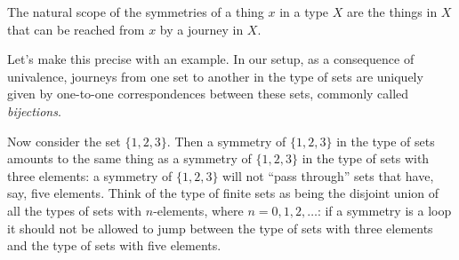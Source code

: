 The natural scope of the symmetries of a thing $x$ in a type $X$
are the things in $X$ that can be reached from $x$ by a journey in $X$.

Let's make this precise with an example.
In our setup,
as a consequence of univalence, journeys from one set to another
in the type of sets are
uniquely given by one-to-one correspondences between these sets,
commonly called \emph{bijections}.

Now consider the set $\{1,2,3\}$. Then a symmetry of $\{1,2,3\}$ in the type of  sets amounts to the same thing as a symmetry of $\{1,2,3\}$ in the type of sets with three elements: a symmetry of $\{1,2,3\}$ will not ``pass through'' sets that have, say, five elements. Think of the type of finite sets as being the disjoint union of all the types of sets with $n$-elements, where $n=0,1,2,\dots$: if a symmetry is a loop it should not be allowed to jump between the type of sets with three elements and the type of sets with five elements.

